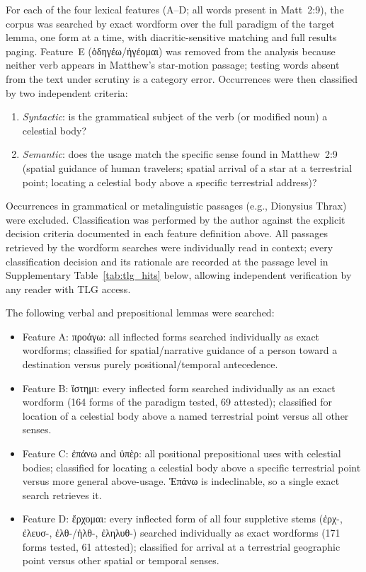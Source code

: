 \documentclass[11pt,a4paper]{article}
\newcommand{\grk}[1]{{\fontencoding{LGR}\selectfont #1}}
\newcommand{\grk}[1]{{\greekfont #1}}
\begin{document}
For each of the four lexical features (A--D; all words present in Matt~2:9),
the corpus was searched by exact wordform over the full paradigm of the target
lemma, one form at a time, with diacritic-sensitive matching and full results
paging. Feature~E (\grk{ὁδηγέω}/\grk{ἡγέομαι}) was removed
from the analysis because neither verb appears in Matthew's star-motion passage;
testing words absent from the text under scrutiny is a category error.
Occurrences were then classified by two independent criteria:
\begin{enumerate}
  \item \textit{Syntactic}: is the grammatical subject of the verb (or
    modified noun) a celestial body?
  \item \textit{Semantic}: does the usage match the specific sense found in
    Matthew~2:9 (spatial guidance of human travelers; spatial arrival of a
    star at a terrestrial point; locating a celestial body above a specific
    terrestrial address)?
\end{enumerate}
Occurrences in grammatical or metalinguistic passages (e.g., Dionysius
Thrax) were excluded. Classification was performed by the author against
the explicit decision criteria documented in each feature definition above.
All passages retrieved by the wordform searches were individually read in
context;
every classification decision and its rationale are recorded at the passage
level in Supplementary Table~\ref{tab:tlg_hits} below, allowing independent verification by
any reader with TLG access.

The following verbal and prepositional lemmas were searched:

\begin{itemize}
  \item Feature A: \grk{προάγω}: all inflected forms searched individually
    as exact wordforms; classified for spatial/narrative guidance of a
    person toward a destination versus purely positional/temporal
    antecedence.
  \item Feature B: \grk{ἵστημι}: every inflected form searched
    individually as an exact wordform (164 forms of the paradigm tested,
    69 attested); classified for location of a celestial body above a
    named terrestrial point versus all other senses.
  \item Feature C: \grk{ἐπάνω} and \grk{ὑπὲρ}: all positional prepositional
    uses with celestial bodies; classified for locating a celestial body
    above a specific terrestrial point versus more general above-usage.
    \grk{Ἐπάνω} is indeclinable, so a single exact search retrieves it.
  \item Feature D: \grk{ἔρχομαι}: every inflected form of all four
    suppletive stems (\grk{ἐρχ-}, \grk{ἐλευσ-}, \grk{ἐλθ-/ἠλθ-},
    \grk{ἐληλυθ-}) searched individually as exact wordforms (171 forms
    tested, 61 attested); classified for arrival at a terrestrial
    geographic point versus other spatial or temporal senses.
\end{itemize}
\end{document}

